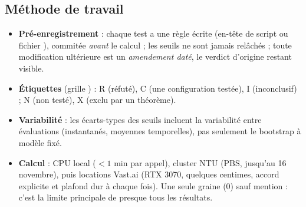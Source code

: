 \subsection{Méthode de travail}
\begin{itemize}
  \item \textbf{Pré-enregistrement} : chaque test a une règle écrite (en-tête de script ou fichier ), commitée \emph{avant} le calcul ; les seuils ne sont jamais relâchés ; toute modification ultérieure est un \emph{amendement daté}, le verdict d'origine restant visible.
  \item \textbf{Étiquettes} (grille ) : R (réfuté), C (une configuration testée), I (inconclusif) ; N (non testé), X (exclu par un théorème).
  \item \textbf{Variabilité} : les écarts-types des seuils incluent la variabilité entre évaluations (instantanés, moyennes temporelles), pas seulement le bootstrap à modèle fixé.
  \item \textbf{Calcul} : CPU local ($<1$ min par appel), cluster NTU (PBS, jusqu'au 16 novembre), puis locations Vast.ai (RTX 3070, quelques centimes, accord explicite et plafond dur à chaque fois). Une seule graine (0) sauf mention : c'est la limite principale de presque tous les résultats.
\end{itemize}
